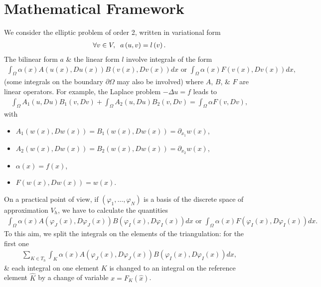 \documentclass[11pt,a4paper,center,notitlepage]{article}
\numberwithin{equation}{section}
\begin{document}
\section{Mathematical Framework}
We consider the elliptic problem of order 2, written in variational form
\begin{align}
\forall v \in V, \hspace{2mm} a\left( {u,v} \right) = l\left( v \right).
\end{align}
The bilinear form $a$ \& the linear form $l$ involve integrals of the form
\begin{align}
\int_\Omega  {\alpha \left( x \right)A\left( {u\left( x \right),Du\left( x \right)} \right)B\left( {v\left( x \right),Dv\left( x \right)} \right)dx} \mbox{ or } \int_\Omega  {\alpha \left( x \right)F\left( {v\left( x \right),Dv\left( x \right)} \right)dx} ,
\end{align}
(some integrals on the boundary $\partial \Omega$ may also be involved) where $A$, $B$, \& $F$ are linear operators. For example, the Laplace problem $-\Delta u = f$ leads to
\begin{align}
\int_\Omega  {{A_1}\left( {u,Du} \right){B_1}\left( {v,Dv} \right)}  + \int_\Omega  {{A_2}\left( {u,Du} \right){B_2}\left( {v,Dv} \right)}  = \int_\Omega  {\alpha F\left( {v,Dv} \right)} ,
\end{align}
with
\begin{itemize}
\item ${A_1}\left( {w\left( x \right),Dw\left( x \right)} \right) = {B_1}\left( {w\left( x \right),Dw\left( x \right)} \right) = {\partial _{{x_1}}}w\left( x \right)$,
\item ${A_2}\left( {w\left( x \right),Dw\left( x \right)} \right) = {B_2}\left( {w\left( x \right),Dw\left( x \right)} \right) = {\partial _{{x_2}}}w\left( x \right)$,
\item $\alpha \left( x \right) = f\left( x \right)$,
\item $F\left( {w\left( x \right),Dw\left( x \right)} \right) = w\left( x \right)$.
\end{itemize}
On a practical point of view, if $\left(\varphi _1,\ldots,\varphi _N\right)$ is a basis of the discrete space of approximation $V_h$, we have to calculate the quantities
\begin{align}
\int_\Omega  {\alpha \left( x \right)A\left( {{\varphi _J}\left( x \right),D{\varphi _J}\left( x \right)} \right)B\left( {{\varphi _I}\left( x \right),D{\varphi _I}\left( x \right)} \right)dx} \mbox{ or } \int_\Omega  {\alpha \left( x \right)F\left( {{\varphi _I}\left( x \right),D{\varphi _I}\left( x \right)} \right)dx} .
\end{align}
To this aim, we split the integrals on the elements of the triangulation: for the first one
\begin{align}
\sum\limits_{K \in {T_h}} {\int_K {\alpha \left( x \right)A\left( {{\varphi _J}\left( x \right),D{\varphi _J}\left( x \right)} \right)B\left( {{\varphi _I}\left( x \right),D{\varphi _I}\left( x \right)} \right)dx} } ,
\end{align}
\& each integral on one element $K$ is changed to an integral on the reference element $\widehat{K}$ by a change of variable $x = {F_K}\left( {\widehat x} \right)$.
\end{document}
